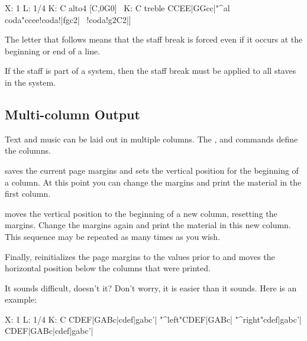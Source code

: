 \documentclass[a4paper,fullpage,12pt]{book}
\begin{document}
\begin{abcsource}
X: 1
L: 1/4
K: C alto4
%
[C,0G0]\
K: C treble
CCEE|GGcc|"^al coda"ccee!coda!|fgc2|\
!coda!g2C2|]
\end{abcsource}


The letter  that follows  means that the
staff break is forced even if it occurs at the beginning or end of a
line.

If the staff is part of a system, then the staff break must be applied
to all staves in the system.


\subsection{Multi-column Output}
\label{sec:multicol}

Text and music can be laid out in multiple columns. The
,  and \metacmd{multicol
end} commands define the columns.

 saves the current page margins and sets the
vertical position for the beginning of a column. At this point you can
change the margins and print the material in the first column.

 moves the vertical position to the beginning of
a new column, resetting the margins. Change the margins again and
print the material in this new column. This sequence may be repeated
as many times as you wish.

Finally,  reinitializes the page margins to the
values prior to  and moves the horizontal
position below the columns that were printed.

It sounds difficult, doesn't it? Don't worry, it is easier than it
sounds. Here is an example:

\begin{abcsource}
X: 1
L: 1/4
K: C
CDEF|GABc|cdef|gabc'|
"^left"CDEF|GABc|
"^right"cdef|gabc'|
CDEF|GABc|cdef|gabc'|
\end{abcsource}
\end{document}
